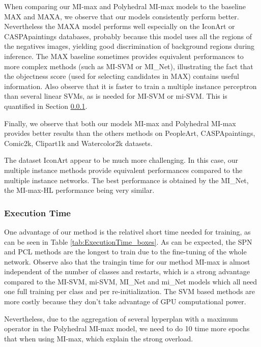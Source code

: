 \documentclass[preprint]{elsarticle}
\newcommand\NB{IconArt} \newcommand\MIL{MI-max without score}
\newcommand\MILS{MI-max}
\newcommand\MAX{MAX}
\newcommand\MAXA{MAXA}
\newcommand\mimaxaddlayerS{MI-max-HL}
\newcommand\MaxOfMaxS{Polyhedral MI-max}
\begin{document}
When comparing our \MILS{} and \MaxOfMaxS{} models to the baseline \MAX{} and \MAXA{}, we observe that our models consistently perform better. Nevertheless the \MAXA{} model performs well especially on the \NB{} or CASPApaintings databases, probably because this model uses all the regions of the negatives images, yielding good discrimination of background regions during inference. The \MAX{} baseline sometimes provides equivalent performances to more complex methods (such as MI-SVM or MI\_Net), illustrating the fact that the objectness score (used for selecting candidates in \MAX{}) contains useful information.
Also observe that it is faster to train a multiple instance perceptron than several linear SVMs, as is needed for MI-SVM or mi-SVM. This is quantified in Section \ref{sec:execution_time}.


Finally, we observe that both our models \MILS{} and \MaxOfMaxS{} provides better results than the others methods on PeopleArt, CASPApaintings, Comic2k, Clipart1k and Watercolor2k datasets.

The dataset \NB{} appear to be much more challenging. In this case, our multiple instance methods provide equivalent performances compared to the multiple instance networks. The best performance is obtained by the MI\_Net, the \mimaxaddlayerS{} performance being very similar. 

\subsubsection{Execution Time}
\label{sec:execution_time}


One advantage of our method is the relativel short time needed for training, as can be seen in Table \ref{tab:ExecutionTime_boxes}.
As can be expected, the SPN and PCL methods are the longest to train due to the fine-tuning of the whole network.
Observe also that the traingin time for our method \MILS{} is almost independent of the number of classes and restarts, which is a strong advantage compared to the MI-SVM, mi-SVM, MI\_Net and mi\_Net models which all need one full training per class and per re-initialization. The SVM based methods are more costly because they don't take advantage of GPU computational power.

Nevertheless, due to the aggregation of several hyperplan with a maximum operator in the \MaxOfMaxS{} model, we need to do 10 time more epochs that when using \MILS{}, which explain the strong overload. 
\end{document}
